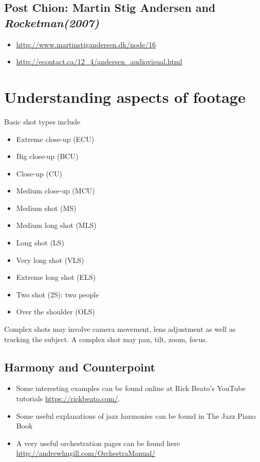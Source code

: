 \subsection{Post Chion: Martin Stig Andersen and \textit{Rocketman(2007)}}
\begin{itemize}
\item \url{http://www.martinstigandersen.dk/node/16}
\item \url{http://econtact.ca/12_4/andersen_audiovisual.html}
\end{itemize}

\section{Understanding aspects of footage}
Basic shot types include
\begin{itemize}
\item Extreme close-up (ECU)
\item Big close-up (BCU)
\item Close-up (CU)
\item Medium close-up (MCU)
\item Medium shot (MS)
\item Medium long shot (MLS)
\item Long shot (LS)
\item Very long shot (VLS)
\item Extreme long shot (ELS)
\item Two shot (2S): two people
\item Over the shoulder (OLS)
\end{itemize}

Complex shots may involve camera movement, lens adjustment as well as tracking the subject. A complex shot may pan, tilt, zoom, focus. 

\subsection{Harmony and Counterpoint}
\begin{itemize}
\item Some interesting examples can be found online at Rick Beato's YouTube tutorials \url{https://rickbeato.com/}. 
\item Some useful explanations of jazz harmonies can be found in The Jazz Piano Book \citep{levine2011jazz}
\item A very useful orchestration pages can be found here \url{http://andrewhugill.com/OrchestraManual/}
\end{itemize}


